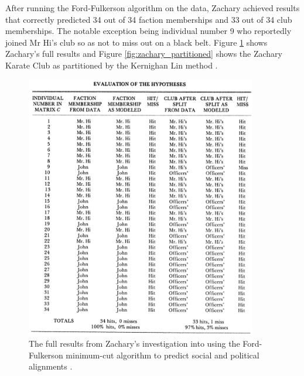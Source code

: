 After running the Ford-Fulkerson algorithm on the data, Zachary achieved results that correctly predicted 34 out of 34 faction memberships and 33 out of 34 club memberships. The notable exception being individual number 9 who reportedly joined Mr Hi's club so as not to miss out on a black belt. Figure \ref{fig:zachary_results} shows Zachary's full results and Figure \ref{fig:zachary_partitioned} shows the Zachary Karate Club as partitioned by the Kernighan Lin method \cite{6771089}.

\begin{figure}
    \begin{center}
        \includegraphics[width=0.9\textwidth]{img/zachary_results}
    \end{center}
    \caption{The full results from Zachary's investigation into using the Ford-Fulkerson minimum-cut algorithm to predict social and political alignments \cite{konect:ucidata-zachary}.}
    \label{fig:zachary_results}
\end{figure}

